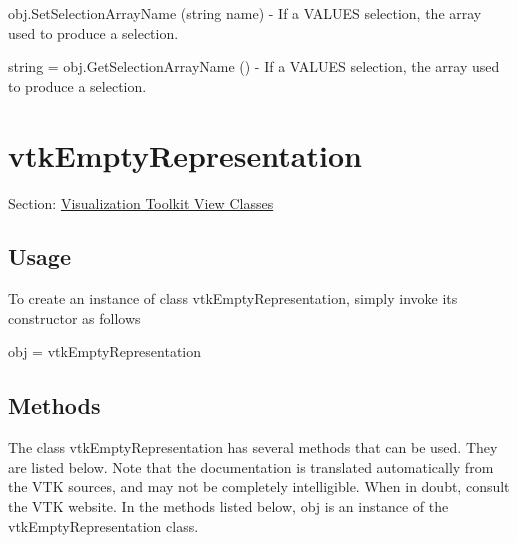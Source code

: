 \begin{DoxyItemize}
\item {\ttfamily obj.\-Set\-Selection\-Array\-Name (string name)} -\/ If a V\-A\-L\-U\-E\-S selection, the array used to produce a selection.  
\item {\ttfamily string = obj.\-Get\-Selection\-Array\-Name ()} -\/ If a V\-A\-L\-U\-E\-S selection, the array used to produce a selection.  
\end{DoxyItemize}\hypertarget{vtkviews_vtkemptyrepresentation}{}\section{vtk\-Empty\-Representation}\label{vtkviews_vtkemptyrepresentation}
Section\-: \hyperlink{sec_vtkviews}{Visualization Toolkit View Classes} \hypertarget{vtkwidgets_vtkxyplotwidget_Usage}{}\subsection{Usage}\label{vtkwidgets_vtkxyplotwidget_Usage}
To create an instance of class vtk\-Empty\-Representation, simply invoke its constructor as follows \begin{DoxyVerb}  obj = vtkEmptyRepresentation
\end{DoxyVerb}
 \hypertarget{vtkwidgets_vtkxyplotwidget_Methods}{}\subsection{Methods}\label{vtkwidgets_vtkxyplotwidget_Methods}
The class vtk\-Empty\-Representation has several methods that can be used. They are listed below. Note that the documentation is translated automatically from the V\-T\-K sources, and may not be completely intelligible. When in doubt, consult the V\-T\-K website. In the methods listed below, {\ttfamily obj} is an instance of the vtk\-Empty\-Representation class. 

